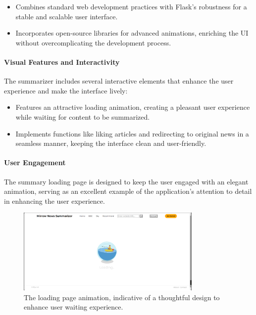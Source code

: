 \documentclass[10pt]{article}
\begin{document}
\begin{itemize}
    \item Combines standard web development practices with Flask's robustness for a stable and scalable user interface.
    \item Incorporates open-source libraries for advanced animations, enriching the UI without overcomplicating the development process.
\end{itemize}

\paragraph{Visual Features and Interactivity}
The summarizer includes several interactive elements that enhance the user experience and make the interface lively:

\begin{itemize}
    \item Features an attractive loading animation, creating a pleasant user experience while waiting for content to be summarized.
    \item Implements functions like liking articles and redirecting to original news in a seamless manner, keeping the interface clean and user-friendly.
\end{itemize}

\paragraph{User Engagement}
The summary loading page is designed to keep the user engaged with an elegant animation, serving as an excellent example of the application's attention to detail in enhancing the user experience.

\begin{figure}[H]
    \centering
    \includegraphics[width=0.8\textwidth]{../loading.png}
    \caption{The loading page animation, indicative of a thoughtful design to enhance user waiting experience.}
\end{figure}
\end{document}
